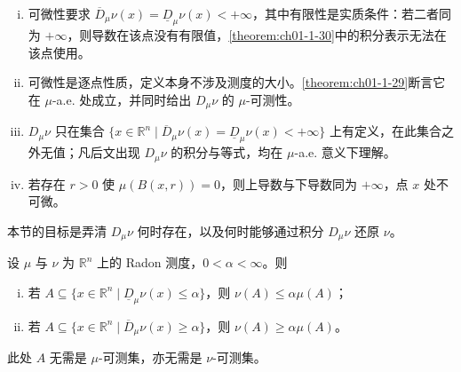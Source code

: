 \documentclass[../../main.tex]{subfiles}%
\begin{document}
\begin{remark}\label{remark:ch01-def-1-21-条件}
\begin{enumerate}[(i)]
\item 可微性要求 $\overline{D}_{\mu}\nu(x)=\underline{D}_{\mu}\nu(x)<+\infty$，其中有限性是实质条件：若二者同为 $+\infty$，则导数在该点没有有限值，\cref{theorem:ch01-1-30}中的积分表示无法在该点使用。%
\item 可微性是逐点性质，定义本身不涉及测度的大小。\cref{theorem:ch01-1-29}断言它在 $\mu$-a.e. 处成立，并同时给出 $D_{\mu}\nu$ 的 $\mu$-可测性。%
\item $D_{\mu}\nu$ 只在集合 $\{x\in\mathbb{R}^n\mid\overline{D}_{\mu}\nu(x)=\underline{D}_{\mu}\nu(x)<+\infty\}$ 上有定义，在此集合之外无值；凡后文出现 $D_{\mu}\nu$ 的积分与等式，均在 $\mu$-a.e. 意义下理解。
\item 若存在 $r>0$ 使 $\mu(B(x,r))=0$，则上导数与下导数同为 $+\infty$，点 $x$ 处不可微。
\end{enumerate}
\end{remark}

本节的目标是弄清 $D_{\mu}\nu$ 何时存在，以及何时能够通过积分 $D_{\mu}\nu$ 还原 $\nu$。

\begin{lemma}[上导数与下导数的测度估计]\label{lemma:ch01-1-2}
设 $\mu$ 与 $\nu$ 为 $\mathbb{R}^n$ 上的 Radon 测度，$0<\alpha<\infty$。则
\begin{enumerate}[(i)]
\item 若 $A\subseteq\{x\in\mathbb{R}^n\mid\underline{D}_{\mu}\nu(x)\leqslant\alpha\}$，则 $\nu(A)\leqslant\alpha\mu(A)$；
\item 若 $A\subseteq\{x\in\mathbb{R}^n\mid\overline{D}_{\mu}\nu(x)\geqslant\alpha\}$，则 $\nu(A)\geqslant\alpha\mu(A)$。
\end{enumerate}
\end{lemma}

\begin{remark}\label{remark:ch01-lem-1-2-可测性}
此处 $A$ 无需是 $\mu$-可测集，亦无需是 $\nu$-可测集。
\end{remark}
\end{document}
